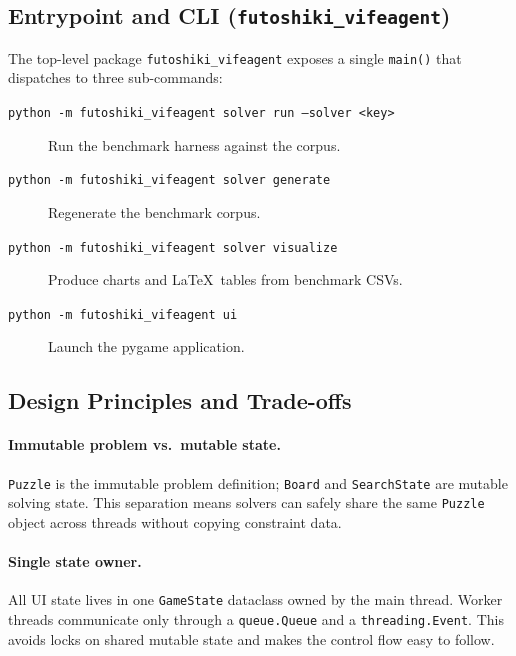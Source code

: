 \subsection{Entrypoint and CLI (\texttt{futoshiki\_vifeagent})}
\label{sec:layer_entry}

The top-level package \texttt{futoshiki\_vifeagent} exposes a single
\texttt{main()} that dispatches to three sub-commands:

\begin{description}
  \item[\texttt{python -m futoshiki\_vifeagent solver run --solver <key>}]
    Run the benchmark harness against the corpus.
  \item[\texttt{python -m futoshiki\_vifeagent solver generate}]
    Regenerate the benchmark corpus.
  \item[\texttt{python -m futoshiki\_vifeagent solver visualize}]
    Produce charts and \LaTeX\ tables from benchmark CSVs.
  \item[\texttt{python -m futoshiki\_vifeagent ui}]
    Launch the pygame application.
\end{description}

\subsection{Design Principles and Trade-offs}
\label{sec:design_principles}

\paragraph{Immutable problem vs.\ mutable state.}
\texttt{Puzzle} is the immutable problem definition; \texttt{Board} and
\texttt{SearchState} are mutable solving state.
This separation means solvers can safely share the same \texttt{Puzzle}
object across threads without copying constraint data.

\paragraph{Single state owner.}
All UI state lives in one \texttt{GameState} dataclass owned by the main
thread.
Worker threads communicate only through a \texttt{queue.Queue} and a
\texttt{threading.Event}.
This avoids locks on shared mutable state and makes the control flow easy to
follow.

